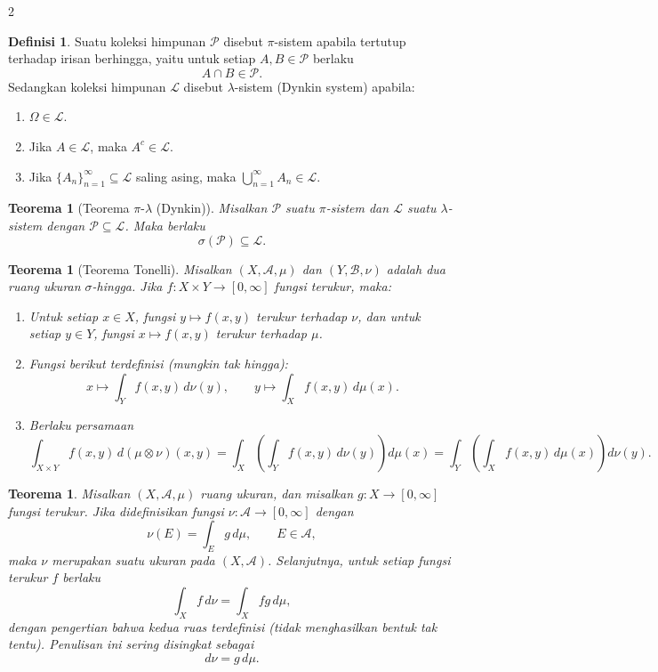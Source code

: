 \documentclass[a4paper,extrafontsizes, 9pt]{memoir}
\theoremstyle{definition}
\newtheorem{definisi}[kalstok]{Definisi}
\theoremstyle{plain}
\newtheorem{teorema}[kalstok]{Teorema}
\theoremstyle{remark}
\begin{document}
\begin{multicols}{2}
  \begin{definisi}
    Suatu koleksi himpunan $\mathcal{P}$ disebut $\pi$-sistem apabila tertutup terhadap irisan berhingga,
    yaitu untuk setiap $A,B\in\mathcal{P}$ berlaku
    \[A\cap B\in\mathcal{P}.\]
    Sedangkan koleksi himpunan $\mathcal{L}$ disebut $\lambda$-sistem (Dynkin system) apabila:
    \begin{enumerate}[leftmargin=*, itemsep=0.5mm]
      \item $\Omega\in\mathcal{L}$.
      \item Jika $A\in\mathcal{L}$, maka $A^c\in\mathcal{L}$.
      \item Jika $\{A_n\}_{n=1}^{\infty}\subseteq\mathcal{L}$ saling asing, maka
            $\bigcup_{n=1}^{\infty}A_n\in\mathcal{L}.$
    \end{enumerate}
  \end{definisi}

  \begin{teorema}[Teorema $\pi$-$\lambda$ (Dynkin)]
    Misalkan $\mathcal{P}$ suatu $\pi$-sistem dan $\mathcal{L}$ suatu $\lambda$-sistem dengan
    $\mathcal{P}\subseteq\mathcal{L}$. Maka berlaku
    \[\sigma(\mathcal{P})\subseteq\mathcal{L}.\]
  \end{teorema}

  \begin{teorema}[Teorema Tonelli]
    Misalkan $(X,\mathcal{A},\mu)$ dan $(Y,\mathcal{B},\nu)$ adalah dua ruang ukuran
    $\sigma$-hingga. Jika $f:X\times Y\to[0,\infty]$ fungsi terukur, maka:
    \begin{enumerate}[leftmargin=*, itemsep=0.5mm]
      \item Untuk setiap $x\in X$, fungsi $y\mapsto f(x,y)$ terukur terhadap $\nu$, dan untuk setiap
            $y\in Y$, fungsi $x\mapsto f(x,y)$ terukur terhadap $\mu$.
      \item Fungsi berikut terdefinisi (mungkin tak hingga):
            \[x\mapsto\int_Y f(x,y)\,d\nu(y),\qquad y\mapsto\int_X f(x,y)\,d\mu(x).\]
      \item Berlaku persamaan
            \[\int_{X\times Y} f(x,y)\,d(\mu\otimes\nu)(x,y)
              =\int_X\left(\int_Y f(x,y)\,d\nu(y)\right)d\mu(x)
              =\int_Y\left(\int_X f(x,y)\,d\mu(x)\right)d\nu(y).\]
    \end{enumerate}
  \end{teorema}

  \begin{teorema}
    Misalkan $(X,\mathcal{A},\mu)$ ruang ukuran, dan misalkan $g:X\to[0,\infty]$ fungsi terukur.
    Jika didefinisikan fungsi $\nu:\mathcal{A}\to[0,\infty]$ dengan
    \[\nu(E)=\int_E g\,d\mu,\qquad E\in\mathcal{A},\]
    maka $\nu$ merupakan suatu ukuran pada $(X,\mathcal{A})$. Selanjutnya, untuk setiap fungsi terukur
    $f$ berlaku
    \[\int_X f\,d\nu=\int_X fg\,d\mu,\]
    dengan pengertian bahwa kedua ruas terdefinisi (tidak menghasilkan bentuk tak tentu).
    Penulisan ini sering disingkat sebagai
    \[d\nu=g\,d\mu.\]
  \end{teorema}


\end{multicols}
\end{document}
